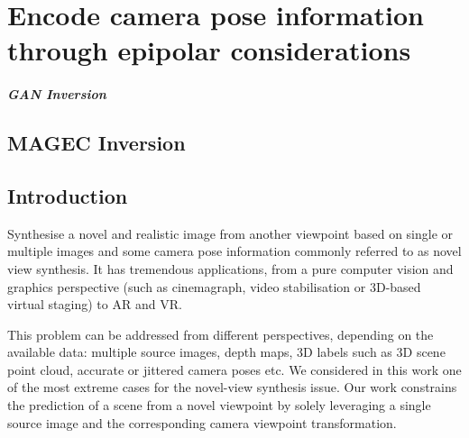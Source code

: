 \chapter{Encode camera pose information through epipolar considerations}
\label{chapter:epipolarnvs}

\newcommand{\tableindent}{\,\,\,\,}
\newcommand{\vt}{\mathbf{t}}
\newcommand{\std}{$\pm\,$}
\newcommand{\clf}{\textit{clf}} \newcommand{\gray}[1]{{\color{darkgray}#1}}











\paragraph{GAN Inversion} 

\section{MAGEC Inversion}
\label{section:magec}


\section{Introduction}

Synthesise a novel and realistic image from another viewpoint based on single or multiple images and some camera pose information commonly referred to as novel view synthesis. It has tremendous applications, from a pure computer vision and graphics perspective (such as cinemagraph, video stabilisation or 3D-based virtual staging) to \ac{AR} and \ac{VR}.

This problem can be addressed from different perspectives, depending on the available data: multiple source images, depth maps, 3D labels such as 3D scene point cloud, accurate or jittered camera poses etc. We considered in this work one of the most extreme cases for the novel-view synthesis issue. Our work constrains the prediction of a scene from a novel viewpoint by solely leveraging a single source image and the corresponding camera viewpoint transformation. 

